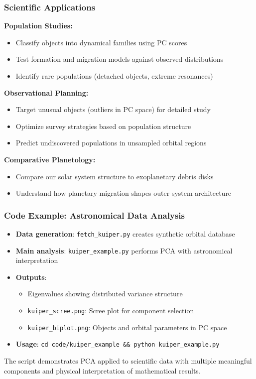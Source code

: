 \documentclass[aspectratio=169]{beamer}
\begin{document}
\begin{frame}
    \frametitle{Scientific Applications}
    \textbf{Population Studies:}
    \begin{itemize}
        \item Classify objects into dynamical families using PC scores \pause
        \item Test formation and migration models against observed distributions \pause
        \item Identify rare populations (detached objects, extreme resonances) \pause
    \end{itemize}
    \vspace{6pt}
    \textbf{Observational Planning:}
    \begin{itemize}
        \item Target unusual objects (outliers in PC space) for detailed study \pause
        \item Optimize survey strategies based on population structure \pause
        \item Predict undiscovered populations in unsampled orbital regions \pause
    \end{itemize}
    \vspace{6pt}
    \textbf{Comparative Planetology:}
    \begin{itemize}
        \item Compare our solar system structure to exoplanetary debris disks \pause
        \item Understand how planetary migration shapes outer system architecture \pause
    \end{itemize}
\end{frame}

\begin{frame}
    \frametitle{Code Example: Astronomical Data Analysis}
    \begin{itemize}
        \item \textbf{Data generation}: \texttt{fetch\_kuiper.py} creates synthetic orbital database \pause
        \item \textbf{Main analysis}: \texttt{kuiper\_example.py} performs PCA with astronomical interpretation \pause
        \item \textbf{Outputs}:
              \begin{itemize}
                  \item Eigenvalues showing distributed variance structure \pause
                  \item \texttt{kuiper\_scree.png}: Scree plot for component selection \pause
                  \item \texttt{kuiper\_biplot.png}: Objects and orbital parameters in PC space \pause
              \end{itemize}
        \item \textbf{Usage}: \texttt{cd code/kuiper\_example \&\& python kuiper\_example.py} \pause
    \end{itemize}
    \vspace{6pt}
    The script demonstrates PCA applied to scientific data with multiple meaningful components and physical interpretation of mathematical results.
\end{frame}
\end{document}
